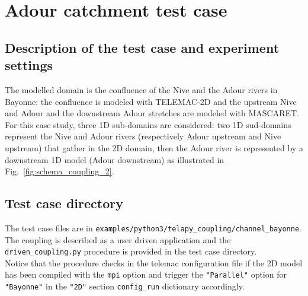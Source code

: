 \section{Adour catchment test case}
\subsection{Description of the test case and experiment settings}
The modelled domain is the confluence of the Nive and the Adour rivers
in Bayonne: the confluence is modeled with TELEMAC-2D and the upstream
Nive and Adour and the downstream Adour stretches are modeled with
MASCARET. For this case study, three 1D sub-domains are considered:
two 1D sud-domains represent the Nive and Adour rivers (respectively
Adour upstream and Nive upstream) that gather in the 2D domain, then
the Adour river is represented by a downstream 1D model (Adour
downstream) as illustrated in Fig.~\ref{fig:schema_coupling_2}.

\subsection{Test case directory}
The test case files are in
\texttt{examples/python3/telapy\_coupling/channel\_bayonne}.\\

The coupling is described as a user driven application and the
\texttt{driven\_coupling.py} procedure is provided in the test case
directory.\\
Notice that the procedure checks in the telemac configuration file if
the 2D model has been compiled with the \texttt{mpi} option and
trigger the \texttt{"Parallel"} option for \texttt{"Bayonne"} in the
\texttt{"2D"} section  \texttt{config\_run} dictionary accordingly.\\

